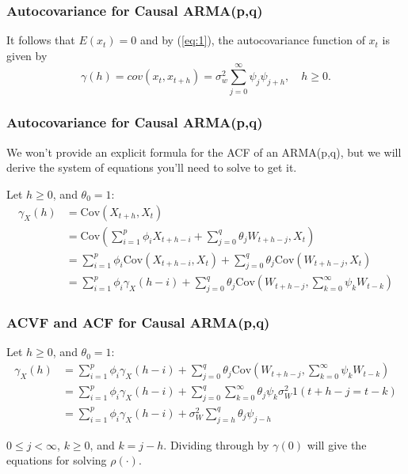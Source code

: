 \documentclass[%
xcolor=pdftex]{beamer}
\begin{document}
\begin{frame}
\frametitle{Autocovariance for Causal ARMA(p,q)}

It follows  that $E(x_t)=0$ and by (\ref{eq:1}), the
autocovariance function of $x_t$ is given by
$$
\gamma(h) =cov(x_t,x_{t+h})= \sigma^2_w \sum^\infty_{j=0} \psi_j \psi_{j+h},
\quad h\ge 0.
$$

\end{frame}

\begin{frame}
\frametitle{Autocovariance for Causal ARMA(p,q)}

We won't provide an explicit formula for the ACF of an ARMA(p,q), but we will derive the system of equations you'll need to solve to get it. 

Let $h\ge 0$, and $\theta_0 = 1$:
\begin{align*}
\gamma_X(h) &= \text{Cov}(X_{t+h}, X_t) \\
&= \text{Cov}(\sum_{i=1}^p \phi_i X_{t+h-i} + \sum_{j=0}^q \theta_j W_{t+h-j}, X_t)\\
&= \sum_{i=1}^p \phi_i \text{Cov}(X_{t+h-i} , X_t) + \sum_{j=0}^q \theta_j \text{Cov}\left( W_{t+h-j}, X_t\right) \\
&= \sum_{i=1}^p \phi_i \gamma_X(h-i) + \sum_{j=0}^q \theta_j \text{Cov}\left( W_{t+h-j}, \sum^\infty_{k=0} \psi_k W_{t-k}\right)
\end{align*}

\end{frame}


\begin{frame}
\frametitle{ACVF and ACF for Causal ARMA(p,q)}

Let $h\ge 0$, and $\theta_0 = 1$:
\begin{align*}
\gamma_X(h) &= \sum_{i=1}^p \phi_i \gamma_X(h-i) + \sum_{j=0}^q \theta_j \text{Cov}\left( W_{t+h-j}, \sum^\infty_{k=0} \psi_k W_{t-k}\right) \\
&= \sum_{i=1}^p \phi_i \gamma_X(h-i) + \sum_{j=0}^q\sum^\infty_{k=0}  \theta_j\psi_k \sigma^2_W 1( t+h-j = t-k) \\
&= \sum_{i=1}^p \phi_i \gamma_X(h-i) + \sigma^2_W \sum_{j=h}^q \theta_j\psi_{j-h} 
\end{align*}

$0 \le j < \infty$, $k \ge 0$, and $k = j - h$. Dividing through by $\gamma(0)$ will give the equations for solving $\rho(\cdot)$.

\end{frame}
\end{document}
